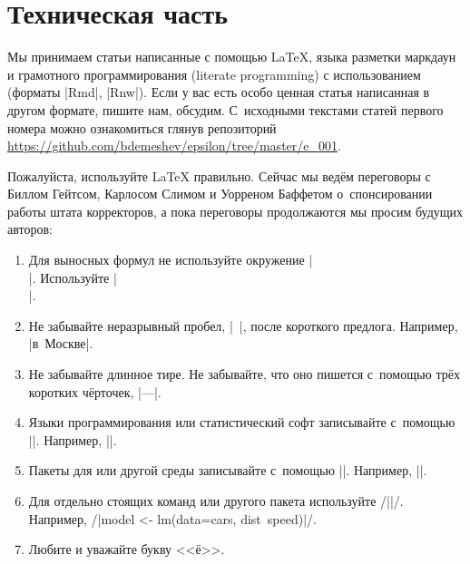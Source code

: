 \documentclass[final,pdftex]{../../template/epsilonj}
\begin{document}
\section{Техническая часть}


Мы принимаем статьи написанные с помощью \LaTeX, языка разметки маркдаун и грамотного программирования (literate programming) с использованием  (форматы \code|Rmd|, \code|Rnw|). Если у вас есть особо ценная статья написанная в другом формате, пишите нам, обсудим. С~исходными текстами статей первого номера можно ознакомиться глянув репозиторий \url{https://github.com/bdemeshev/epsilon/tree/master/e_001}.

Пожалуйста, используйте \LaTeX{} правильно. Сейчас мы ведём переговоры с Биллом Гейтсом, Карлосом Слимом и Уорреном Баффетом о~спонсировании работы штата корректоров, а пока переговоры продолжаются мы просим будущих авторов:

\begin{enumerate}
\item Для выносных формул не используйте окружение \code|$$ $$|. Используйте \code|\[ \]|.
\item Не забывайте неразрывный пробел, \code|~|, после короткого предлога. Например, \code|в~Москве|.
\item Не забывайте длинное тире. Не забывайте, что оно пишется с~помощью трёх коротких чёрточек, \code|---|.
\item Языки программирования или статистический софт записывайте с~помощью \code|\proglang{}|. Например, \code||.
\item Пакеты для  или другой среды записывайте с~помощью \code|\pkg{}|. Например, \code||.
\item Для отдельно стоящих команд  или другого пакета используйте \code/\code||/. Например, \code/\code|model <- lm(data=cars, dist~speed)|/.
\item Любите и уважайте букву <<ё>>.
\end{enumerate}
\end{document}
